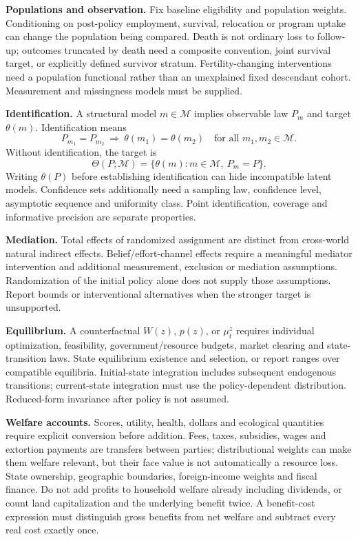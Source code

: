 \documentclass[11pt,a4paper]{article}
\begin{document}
\textbf{Populations and observation.} Fix baseline eligibility and population weights. Conditioning on post-policy employment, survival, relocation or program uptake can change the population being compared. Death is not ordinary loss to follow-up; outcomes truncated by death need a composite convention, joint survival target, or explicitly defined survivor stratum. Fertility-changing interventions need a population functional rather than an unexplained fixed descendant cohort. Measurement and missingness models must be supplied.

\textbf{Identification.} A structural model \(m\in\mathcal M\) implies observable law \(P_m\) and target \(\theta(m)\). Identification means
\[
 P_{m_1}=P_{m_2}\ \Longrightarrow\ \theta(m_1)=\theta(m_2)
 \quad\text{for all }m_1,m_2\in\mathcal M .
\]
Without identification, the target is
\[
 \Theta(P;\mathcal M)=\{\theta(m):m\in\mathcal M,\ P_m=P\}.
\]
Writing \(\theta(P)\) before establishing identification can hide incompatible latent models. Confidence sets additionally need a sampling law, confidence level, asymptotic sequence and uniformity class. Point identification, coverage and informative precision are separate properties.

\textbf{Mediation.} Total effects of randomized assignment are distinct from cross-world natural indirect effects. Belief/effort-channel effects require a meaningful mediator intervention and additional measurement, exclusion or mediation assumptions. Randomization of the initial policy alone does not supply those assumptions. Report bounds or interventional alternatives when the stronger target is unsupported.

\textbf{Equilibrium.} A counterfactual \(W(z)\), \(p(z)\), or \(\mu_t^z\) requires individual optimization, feasibility, government/resource budgets, market clearing and state-transition laws. State equilibrium existence and selection, or report ranges over compatible equilibria. Initial-state integration includes subsequent endogenous transitions; current-state integration must use the policy-dependent distribution. Reduced-form invariance after policy is not assumed.

\textbf{Welfare accounts.} Scores, utility, health, dollars and ecological quantities require explicit conversion before addition. Fees, taxes, subsidies, wages and extortion payments are transfers between parties; distributional weights can make them welfare relevant, but their face value is not automatically a resource loss. State ownership, geographic boundaries, foreign-income weights and fiscal finance. Do not add profits to household welfare already including dividends, or count land capitalization and the underlying benefit twice. A benefit-cost expression must distinguish gross benefits from net welfare and subtract every real cost exactly once.
\end{document}
